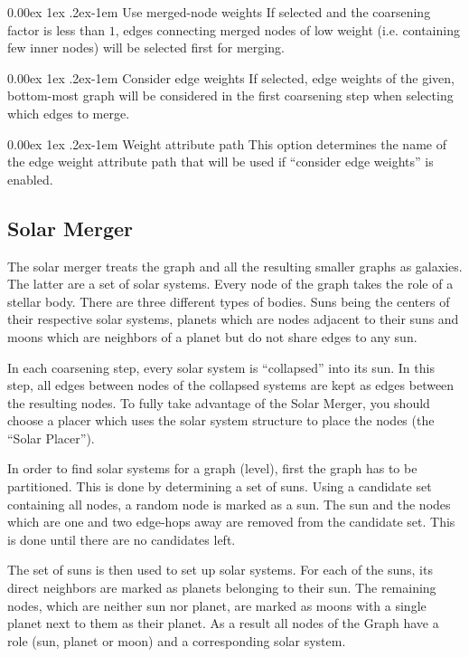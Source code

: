\documentclass{tufte-handout}
\makeatletter
\renewcommand{\paragraph}{%
  \@startsection{paragraph}{4}%
  {\z@}{0.00ex \@plus 1ex \@minus .2ex}{-1em}%
  {\normalfont\normalsize\bfseries}%
}
\makeatother
\begin{document}
  \paragraph{Use merged-node weights} If selected and the coarsening factor is
  less than $1$, edges connecting merged nodes of low weight (i.e. containing
  few inner nodes) will be selected first for merging.

  \paragraph{Consider edge weights} If selected, edge weights of the given,
  bottom-most graph will be considered in the first coarsening step when
  selecting which edges to merge.

  \paragraph{Weight attribute path} This option determines the name of the edge
  weight attribute path that will be used if ``consider edge weights'' is
  enabled.

  \subsection{Solar Merger}
  The solar merger treats the graph and all the resulting smaller graphs as galaxies. The
  latter are a set of solar systems. Every node of the graph takes the role of a stellar body.
  There are three different types of bodies. Suns being the centers of their respective solar
  systems, planets which are nodes adjacent to their suns and moons which are neighbors of
  a planet but do not share edges to any sun.

  In each coarsening step, every solar system is “collapsed” into its sun. In this step, all
  edges between nodes of the collapsed systems are kept as edges between the resulting
  nodes. To fully take advantage of the Solar Merger, you should choose a placer which uses
  the solar system structure to place the nodes (the “Solar Placer”).

  In order to find solar systems for a graph (level), first the graph has to be
  partitioned. This is done by determining a set of suns. Using a candidate set
  containing all nodes, a random node is marked as a sun. The sun and the nodes
  which are one and two edge-hops away are removed from the candidate set. This is
  done until there are no candidates left.

  The set of suns is then used to set up solar systems. For each of the suns,
  its direct neighbors are marked as planets belonging to their sun. The remaining
  nodes, which are neither sun nor planet, are marked as moons with a single
  planet next to them as their planet. As a result all nodes of the Graph have a
  role (sun, planet or moon) and a corresponding solar system.
\end{document}
